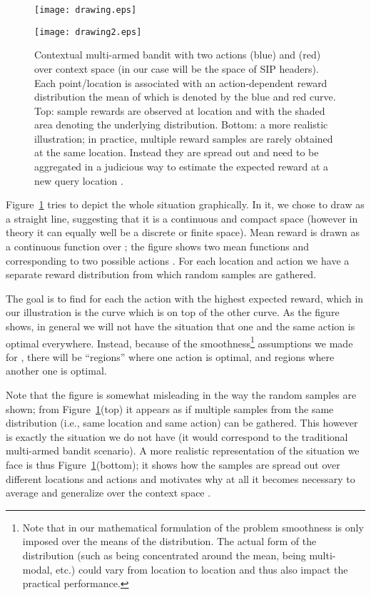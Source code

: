 \documentclass{llncs}
\begin{document}
\begin{figure}[!t]
\begin{center}
		\texttt{[image: drawing.eps]}	\\ \medskip
			
		\texttt{[image: drawing2.eps]}
\end{center}		
\caption{Contextual multi-armed bandit with two actions (blue) and (red) over context 
space  (in our case  will be the space of SIP headers). 
Each point/location  is associated with an action-dependent reward 
distribution the mean of which is denoted by the blue and red curve. Top: sample rewards are
observed at location  and  with the shaded area denoting the underlying distribution.
Bottom: a more realistic illustration; in practice, multiple reward samples are rarely obtained 
at the same location. Instead they are spread out and need to be aggregated in a judicious way
to estimate the expected reward at a new query location .}
\label{fig:drawing}
\end{figure}
Figure~\ref{fig:drawing} tries to depict the whole situation graphically. In it, we chose to
draw  as a straight line, suggesting that it is a continuous and
compact space (however in theory it can equally well be a discrete or finite
space). Mean reward  is drawn as a continuous function over ;
the figure shows two mean functions  and  corresponding
to two possible actions . For each location  and action 
we have a separate reward distribution  from which 
random samples  are gathered.

The goal is to find for each  the action with the highest expected reward, 
which in our illustration is the curve which is on top of the other curve. As
the figure shows, in general we will not have the situation that one and the
same action is optimal everywhere. Instead, because of the smoothness\footnote{Note 
that in our mathematical formulation of the problem smoothness is only imposed
over the means of the distribution. The actual form of the distribution (such as
being concentrated around the mean, being multi-modal, etc.) could vary
from location to location and thus also impact the practical performance.} 
assumptions we made for , there will be ``regions'' where one action 
is optimal, and regions where another one is optimal.

Note that the figure is somewhat misleading in the way the random samples are 
shown; from Figure~\ref{fig:drawing}(top) it appears as if multiple samples from the same distribution
(i.e., same location and same action) can be gathered. This however is exactly
the situation we do not have (it would correspond to the traditional 
multi-armed bandit scenario). A more realistic representation of the situation we
face is thus Figure~\ref{fig:drawing}(bottom); it shows how the samples are spread out over 
different locations and actions and motivates why at all it becomes necessary to 
average and generalize over the context space .
\end{document}
